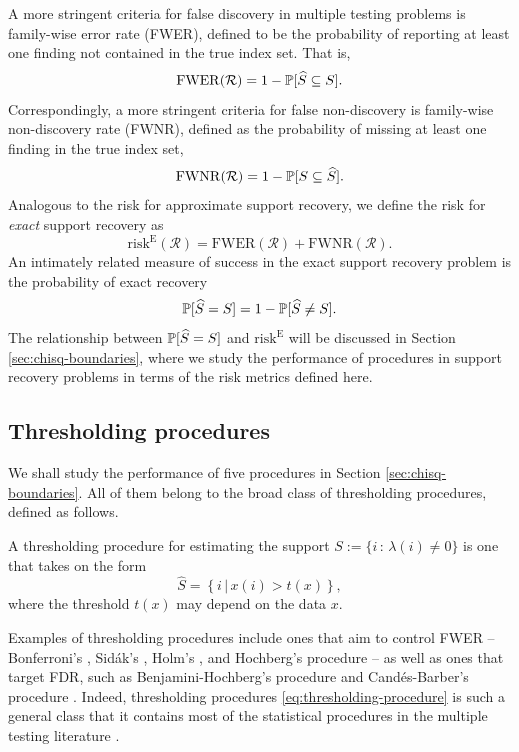 A more stringent criteria for false discovery in multiple testing problems is family-wise error rate (FWER), defined to be the probability of reporting at least one finding not contained in the true index set.
That is,
\begin{equation} \label{eq:FWER}
    \mathrm{FWER}(\mathcal{R}) = 1 - \P[\widehat{S} \subseteq S].
\end{equation}
Correspondingly, a more stringent criteria for false non-discovery is family-wise non-discovery rate (FWNR), defined as the probability of missing at least one finding in the true index set,
\begin{equation} \label{eq:FWNDR}
    \mathrm{FWNR}(\mathcal{R}) = 1 - \P[S \subseteq \widehat{S}].
\end{equation}
Analogous to the risk for approximate support recovery, we define the risk for \emph{exact} support recovery as
\begin{equation} \label{eq:risk-exact}
    \mathrm{risk}^{\mathrm{E}}(\mathcal{R}) = \mathrm{FWER}(\mathcal{R}) + \mathrm{FWNR}(\mathcal{R}).
\end{equation}
An intimately related measure of success in the exact support recovery problem is the probability of exact recovery 
\begin{equation} \label{eq:risk-prob}
    \P[\widehat{S} = S] = 1 - \P[\widehat{S} \neq S].
\end{equation}
The relationship between $\P[\widehat{S} = S]$ and $\mathrm{risk}^{\mathrm{E}}$ will be discussed in Section \ref{sec:chisq-boundaries}, where we study the performance of procedures in support recovery problems in terms of the risk metrics defined here.

\subsection{Thresholding procedures}
\label{subsec:thresholding-procedures}

We shall study the performance of five procedures in Section \ref{sec:chisq-boundaries}.
All of them belong to the broad class of thresholding procedures, defined as follows.
\begin{definition}
A thresholding procedure for estimating the support 
$S:=\{i\, :\, \lambda(i)\neq0\}$ is one that takes on the form
\begin{equation} \label{eq:thresholding-procedure}
    \widehat{S} = \left\{i\,|\,x(i) > t(x)\right\},
\end{equation}
where the threshold $t(x)$ may depend on the data $x$.
\end{definition}
Examples of thresholding procedures include ones that aim to control FWER -- Bonferroni's \cite{dunn1961multiple}, Sid\'ak's \citep{vsidak1967rectangular}, Holm's \citep{holm1979simple}, and Hochberg's procedure \citep{hochberg1988sharper} -- as well as ones that target FDR, such as Benjamini-Hochberg's procedure \cite{benjamini1995controlling} and Cand\'es-Barber's procedure \cite{barber2015controlling}.
Indeed, thresholding procedures \eqref{eq:thresholding-procedure} is such a general class that it contains most of the statistical procedures in the multiple testing literature \cite{roquain2011type}.

